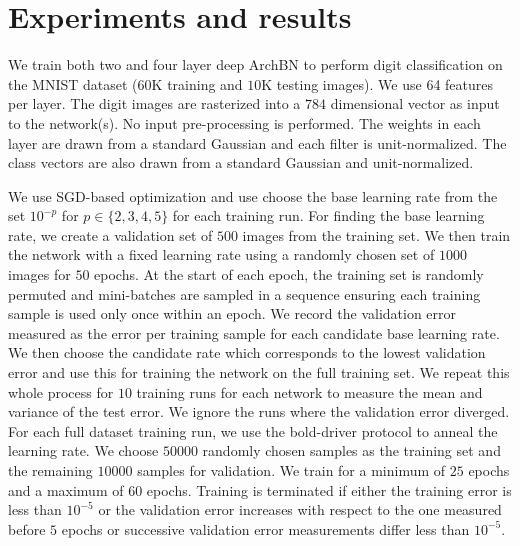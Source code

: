 \documentclass{article} %
\newcommand{\changeBM}[1]{#1} %
\newcommand{\changeVB}[1]{#1} %
\begin{document}
\section{Experiments and results}
\label{Experiments}
We train both two and four layer deep ArchBN to perform digit classification on the MNIST dataset ($60$K training and $10$K testing images). We use 64 features per layer. The digit images are rasterized into a $784$ dimensional vector as input to the network(s). No input pre-processing \changeBM{is} performed. The weights in each layer are drawn from a standard Gaussian and each filter is unit-normalized. The class vectors are also drawn from a standard Gaussian and unit-normalized.  


We use SGD-based optimization and use choose the base learning rate from the set $10^{-p}$ \changeBM{for $p \in \{2, 3, 4, 5\}$} for each training run. For finding the base learning rate, we create a validation set of $500$ images from the training set. We then train the network with a fixed learning rate using a randomly chosen set of $1000$ images for $50$ epochs. At the start of each epoch, the training set is randomly permuted and mini-batches are sampled in a sequence ensuring each training sample is used only once within an epoch. We record the validation error measured as the error per training sample for each candidate base learning rate. We then choose the candidate rate which corresponds to the lowest validation error and use this for training the network on the full training set. We repeat this whole process for $10$ training runs for each network to measure the mean and variance of the test error. \changeBM{We ignore the runs where the validation error diverged.} \changeVB{For each full dataset training run, we use the bold-driver protocol \cite{HintonBoldDriver} to anneal the learning rate.} We choose $50000$ randomly chosen samples as the training set and the remaining $10000$ samples for validation. We train for a minimum of $25$ epochs and a maximum of $60$ epochs. Training is terminated if either the training error is less than $10^{-5}$ or the validation error increases with respect to the one measured before $5$ epochs or successive validation error measurements differ less than $10^{-5}$. 
\end{document}
